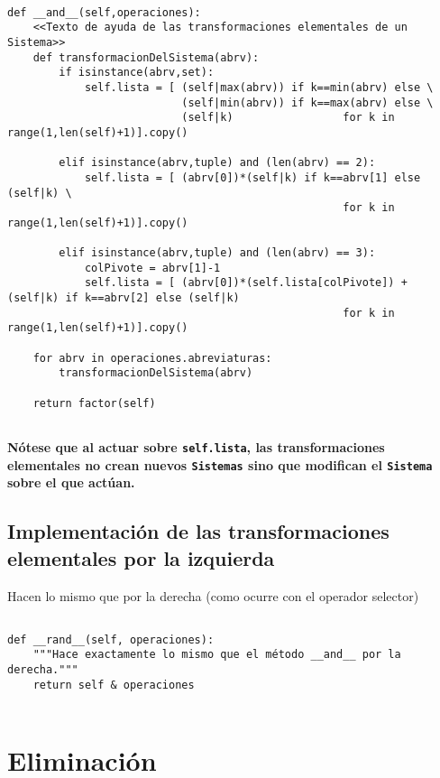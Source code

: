 \documentclass[11pt]{report}
\begin{document}
\begin{verbatim}

def __and__(self,operaciones):
    <<Texto de ayuda de las transformaciones elementales de un Sistema>>
    def transformacionDelSistema(abrv):
        if isinstance(abrv,set):
            self.lista = [ (self|max(abrv)) if k==min(abrv) else \
                           (self|min(abrv)) if k==max(abrv) else \
                           (self|k)                 for k in range(1,len(self)+1)].copy()
            
        elif isinstance(abrv,tuple) and (len(abrv) == 2):
            self.lista = [ (abrv[0])*(self|k) if k==abrv[1] else (self|k) \
                                                    for k in range(1,len(self)+1)].copy()

        elif isinstance(abrv,tuple) and (len(abrv) == 3):
            colPivote = abrv[1]-1
            self.lista = [ (abrv[0])*(self.lista[colPivote]) + (self|k) if k==abrv[2] else (self|k)
                                                    for k in range(1,len(self)+1)].copy()

    for abrv in operaciones.abreviaturas:
        transformacionDelSistema(abrv)

    return factor(self)
        
\end{verbatim}

\textbf{Nótese que al actuar sobre \texttt{self.lista}, las transformaciones elementales no crean nuevos 
\texttt{Sistemas} sino que modifican el \texttt{Sistema} sobre el que actúan.}

\subsection{Implementación de las transformaciones elementales por la izquierda}
\label{sec:orgc89215d}

Hacen lo mismo que por la derecha (como ocurre con el operador selector)

\begin{verbatim}
        
def __rand__(self, operaciones):
    """Hace exactamente lo mismo que el método __and__ por la derecha."""
    return self & operaciones
    
\end{verbatim}

\section{Eliminación}
\label{sec:orgceba403}
\end{document}
